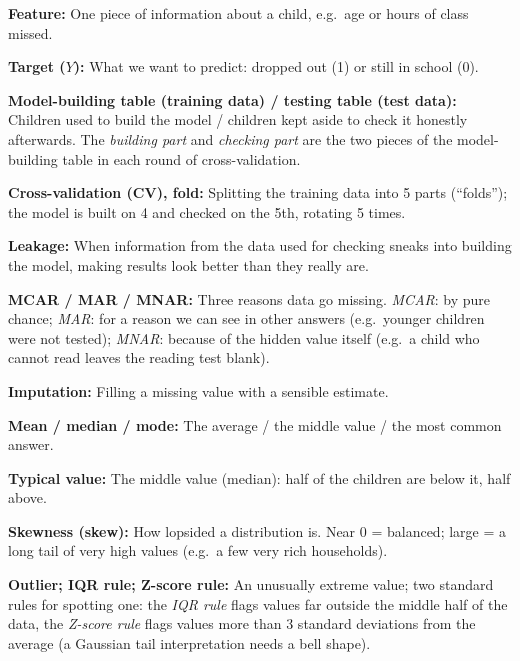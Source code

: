 \documentclass[conference,a4paper]{IEEEtran}
\begin{document}
{\footnotesize
\noindent\textbf{Feature:} One piece of information about a child, e.g.\ age or hours of class missed.\par\vspace{2pt}
\noindent\textbf{Target ($Y$):} What we want to predict: dropped out (1) or still in school (0).\par\vspace{2pt}
\noindent\textbf{Model-building table (training data) / testing table (test data):} Children used to build the model / children kept aside to check it honestly afterwards. The \emph{building part} and \emph{checking part} are the two pieces of the model-building table in each round of cross-validation.\par\vspace{2pt}
\noindent\textbf{Cross-validation (CV), fold:} Splitting the training data into 5 parts (``folds''); the model is built on 4 and checked on the 5th, rotating 5 times.\par\vspace{2pt}
\noindent\textbf{Leakage:} When information from the data used for checking sneaks into building the model, making results look better than they really are.\par\vspace{2pt}
\noindent\textbf{MCAR / MAR / MNAR:} Three reasons data go missing. \emph{MCAR}: by pure chance; \emph{MAR}: for a reason we can see in other answers (e.g.\ younger children were not tested); \emph{MNAR}: because of the hidden value itself (e.g.\ a child who cannot read leaves the reading test blank).\par\vspace{2pt}
\noindent\textbf{Imputation:} Filling a missing value with a sensible estimate.\par\vspace{2pt}
\noindent\textbf{Mean / median / mode:} The average / the middle value / the most common answer.\par\vspace{2pt}
\noindent\textbf{Typical value:} The middle value (median): half of the children are below it, half above.\par\vspace{2pt}
\noindent\textbf{Skewness (skew):} How lopsided a distribution is. Near 0 = balanced; large = a long tail of very high values (e.g.\ a few very rich households).\par\vspace{2pt}
\noindent\textbf{Outlier; IQR rule; Z-score rule:} An unusually extreme value; two standard rules for spotting one: the \emph{IQR rule} flags values far outside the middle half of the data, the \emph{Z-score rule} flags values more than 3 standard deviations from the average (a Gaussian tail interpretation needs a bell shape).\par\vspace{2pt}
}
\end{document}
